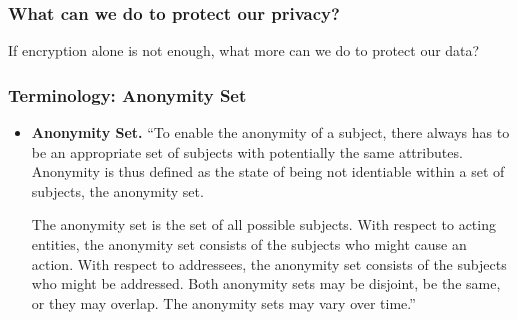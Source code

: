 \begin{frame}
  \frametitle{What can we do to protect our privacy?}

  If encryption alone is not enough, what more can we do to protect our data?

\end{frame}


\begin{frame}
  \frametitle{Terminology: Anonymity Set}

  \begin{itemize}
    \item \textbf{Anonymity Set.} ``To enable the anonymity of a subject, there always
    has to be an appropriate set of subjects with potentially the same
    attributes.  Anonymity is thus defined as the state of being not identiable
    within a set of subjects, the anonymity set.

    The anonymity set is the set of all possible subjects.  With respect to
    acting entities, the anonymity set consists of the subjects who might cause
    an action.  With respect to addressees, the anonymity set consists of the
    subjects who might be addressed.  Both anonymity sets may be disjoint, be
    the same, or they may overlap.  The anonymity sets may vary over time.''
  \end{itemize}
\end{frame}


